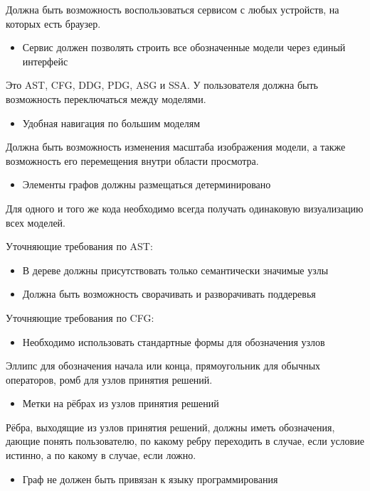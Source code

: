 Должна быть возможность воспользоваться сервисом с любых устройств, на которых есть браузер.
\begin{itemize}
\item Сервис должен позволять строить все обозначенные модели через единый интерфейс
\end{itemize}

Это AST, CFG, DDG, PDG, ASG и SSA. У пользователя должна быть возможность переключаться между моделями.
\begin{itemize}
\item Удобная навигация по большим моделям
\end{itemize}

Должна быть возможность изменения масштаба изображения модели, а также возможность его перемещения внутри области просмотра.
\begin{itemize}
\item Элементы графов должны размещаться детерминировано
\end{itemize}

Для одного и того же кода необходимо всегда получать одинаковую визуализацию всех моделей.

Уточняющие требования по AST:
\begin{itemize}
\item В дереве должны присутствовать только семантически значимые узлы
\item Должна быть возможность сворачивать и разворачивать поддеревья
\end{itemize}

Уточняющие требования по CFG:
\begin{itemize}
\item Необходимо использовать стандартные формы для обозначения узлов
\end{itemize}

Эллипс для обозначения начала или конца, прямоугольник для обычных операторов, ромб для узлов принятия решений.
\begin{itemize}
\item Метки на рёбрах из узлов принятия решений
\end{itemize}

Рёбра, выходящие из узлов принятия решений, должны иметь обозначения, дающие понять пользователю, по какому ребру переходить в случае, если условие истинно, а по какому в случае, если ложно.
\begin{itemize}
\item Граф не должен быть привязан к языку программирования
\end{itemize}

